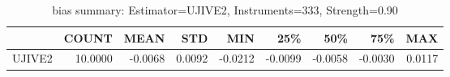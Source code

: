 \begin{table}[ht]
\centering
\caption{bias summary: Estimator=UJIVE2, Instruments=333, Strength=0.90}
\begin{tabular}{lrrrrrrrr}
\toprule
 & COUNT & MEAN & STD & MIN & 25\% & 50\% & 75\% & MAX \\
\midrule
UJIVE2 & 10.0000 & -0.0068 & 0.0092 & -0.0212 & -0.0099 & -0.0058 & -0.0030 & 0.0117 \\
\bottomrule
\end{tabular}
\end{table}
